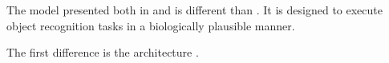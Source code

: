
%

The model presented both in \cite{multi_scale_STDP} and \cite{STDP_vis_feat} is different than \cite{SNN}.
It is designed to execute object recognition tasks in a biologically plausible manner.

The first difference is the architecture \cite{multi_scale_STDP,STDP_vis_feat}.

